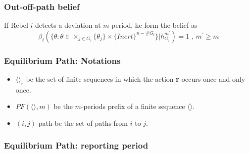 \documentclass[12pt,letter]{article}
\theoremstyle{definition}
\theoremstyle{remark}
\theoremstyle{claim}
\begin{document}
\subsubsection{Out-off-path belief}

If Rebel $i$ detects a deviation at $m$ period, he form the belief as
\begin{equation}
\beta_{i}(\{\theta:\theta\in \times_{j\in G_i}\{\theta_j\}\times\{Inert\}^{n-\#G_i}\}|h^{m^{'}}_{G_i})=1 \text{ , } m^{'}\geq m
\end{equation}



\subsubsection{Equilibrium Path: Notations}


\begin{itemize}

\item $\langle \rangle_r$ be the set of finite sequences in which the action \textbf{r} occurs once and only once.
\item $PF(\langle \rangle,m)$ be the $m$-periods prefix of a finite sequence $\langle \rangle$.
\item $(i,j)$-path be the set of paths from $i$ to $j$.

\end{itemize}

\subsubsection{Equilibrium Path: reporting period}
\end{document}
